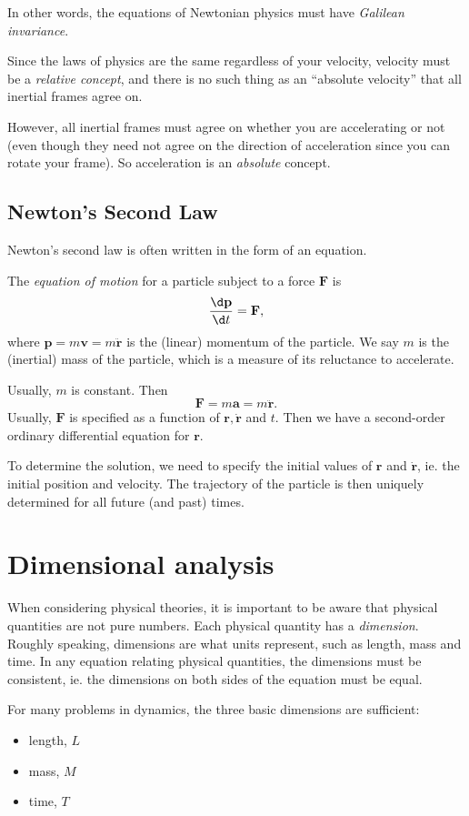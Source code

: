 \documentclass[a4paper]{article}
\begin{document}
In other words, the equations of Newtonian physics must have \emph{Galilean invariance}.

Since the laws of physics are the same regardless of your velocity, velocity must be a \emph{relative concept}, and there is no such thing as an ``absolute velocity'' that all inertial frames agree on.

However, all inertial frames must agree on whether you are accelerating or not (even though they need not agree on the direction of acceleration since you can rotate your frame). So acceleration is an \emph{absolute} concept.

\subsection{Newton's Second Law}
Newton's second law is often written in the form of an equation.
\begin{law}
  The \emph{equation of motion} for a particle subject to a force $\mathbf{F}$ is
  \[
    \frac{\d \mathbf{p}}{\d t} = \mathbf{F},
  \]
  where $\mathbf{p} = m\mathbf{v} = m\ddot{\mathbf{r}}$ is the (linear) momentum of the particle. We say $m$ is the (inertial) mass of the particle, which is a measure of its reluctance to accelerate.
\end{law}

Usually, $m$ is constant. Then
\[
  \mathbf{F} = m\mathbf{a} = m\ddot{\mathbf{r}}.
\]
Usually, $\mathbf{F}$ is specified as a function of $\mathbf{r}, \dot{\mathbf{r}}$ and $t$. Then we have a second-order ordinary differential equation for $\mathbf{r}$.

To determine the solution, we need to specify the initial values of $\mathbf{r}$ and $\dot{\mathbf{r}}$, ie. the initial position and velocity. The trajectory of the particle is then uniquely determined for all future (and past) times.

\section{Dimensional analysis}
When considering physical theories, it is important to be aware that physical quantities are not pure numbers. Each physical quantity has a \emph{dimension}. Roughly speaking, dimensions are what units represent, such as length, mass and time. In any equation relating physical quantities, the dimensions must be consistent, ie. the dimensions on both sides of the equation must be equal.

For many problems in dynamics, the three basic dimensions are sufficient:
\begin{itemize}
  \item length, $L$
  \item mass, $M$
  \item time, $T$
\end{itemize}
\end{document}
